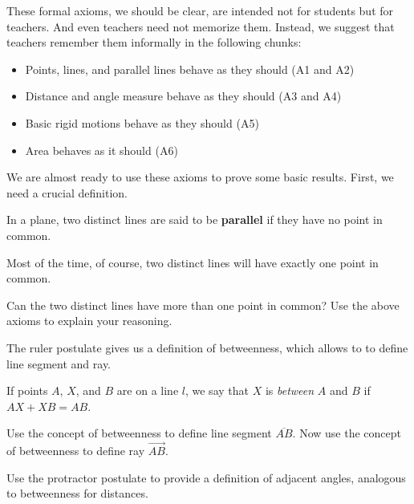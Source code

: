 \bigskip

These formal axioms, we should be clear, are intended not for students but for teachers.  And even teachers need not 
memorize them.  Instead, we suggest that teachers remember them informally in the following chunks:  

\begin{itemize}
\itemsep0em
\item Points, lines, and parallel lines behave as they should (A1 and A2) 
\item Distance and angle measure behave as they should (A3 and A4)
\item Basic rigid motions behave as they should (A5)
\item Area behaves as it should (A6)
\end{itemize}

We are almost ready to use these axioms to prove some basic results.  First, we need a crucial definition.  
\begin{definition}
In a plane, two distinct lines are said to be \textbf{parallel} if they have no point in common.
\end{definition}

Most of the time, of course, two distinct lines will have exactly one point in common.  

\begin{question}
Can the two distinct lines have more than one point in common?  Use the above axioms to explain your reasoning.  
\end{question}
\QM


The ruler postulate gives us a definition of betweenness, which allows to to define line segment and ray.    

\begin{definition}
If points $A$, $X$, and $B$ are on a line $l$, we say that $X$ is \emph{between} $A$ and $B$ if $AX + XB = AB$.
\end{definition}

\begin{question}
Use the concept of betweenness to define line segment $\overline{AB}$.  Now use the concept of betweenness to define ray $\overrightarrow{AB}$. 
\end{question}
\QM

\begin{question}
Use the protractor postulate to provide a definition of adjacent angles, analogous to betweenness for distances.  
\end{question}
\QM

